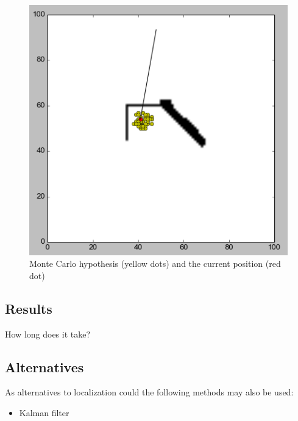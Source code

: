 \begin{figure}[H]
\centering
\includegraphics[scale=0.43]{img/MC.png}
\caption{Monte Carlo hypothesis (yellow dots) and the current position (red dot)}
\label{fig::MC}
\end{figure}

\newpage
\subsection{Results}
How long does it take?

\subsection{Alternatives}
As alternatives to localization could the following methods may also be used:
\begin{itemize}\itemsep-2pt
\item Kalman filter
\end{itemize}

